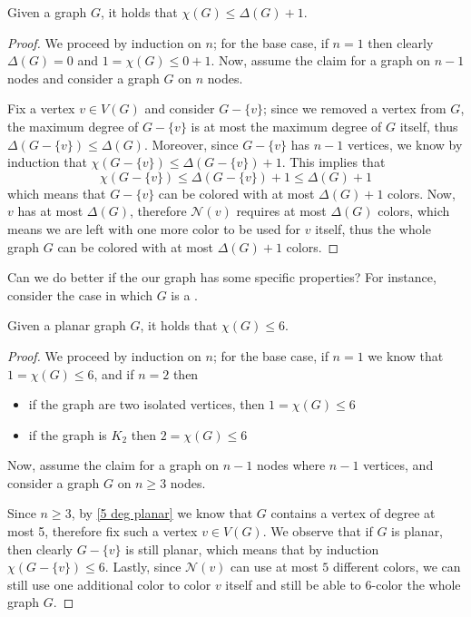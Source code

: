 \documentclass[a4paper, 12pt]{report}
\begin{document}
    \begin{framedprop}{}
        Given a graph $G$, it holds that $\chi(G) \le \Delta(G) + 1$.
    \end{framedprop}

    \begin{proof}
        We proceed by induction on $n$; for the base case, if $n = 1$ then clearly $\Delta(G) = 0$ and $1 = \chi(G) \le 0 + 1$. Now, assume the claim for a graph on $n - 1$ nodes and consider a graph $G$ on $n$ nodes.

        Fix a vertex $v \in V(G)$ and consider $G - \{v\}$; since we removed a vertex from $G$, the maximum degree of $G - \{v\}$ is at most the maximum degree of $G$ itself, thus $\Delta(G - \{v\}) \le \Delta(G)$. Moreover, since $G - \{v\}$ has $n - 1$ vertices, we know by induction that $\chi(G - \{v\}) \le \Delta(G - \{v\}) + 1$. This implies that $$\chi(G - \{v\}) \le \Delta(G - \{v\}) + 1 \le \Delta(G) + 1$$ which means that $G - \{v\}$ can be colored with at most $\Delta(G) + 1$ colors. Now, $v$ has at most $\Delta(G)$, therefore $\mathcal N(v)$ requires at most $\Delta(G)$ colors, which means we are left with one more color to be used for $v$ itself, thus the whole graph $G$ can be colored with at most $\Delta(G) + 1$ colors.
    \end{proof}

    Can we do better if the our graph has some specific properties? For instance, consider the case in which $G$ is a .

    \begin{framedprop}{}
        Given a planar graph $G$, it holds that $\chi(G) \le 6$.
    \end{framedprop}

    \begin{proof}

        We proceed by induction on $n$; for the base case, if $n = 1$ we know that $1 = \chi(G) \le 6$, and if $n = 2$ then

        \begin{itemize}
            \item if the graph are two isolated vertices, then $1 = \chi(G) \le 6$
            \item if the graph is $K_2$ then $2 = \chi(G) \le 6$
        \end{itemize}

        Now, assume the claim for a graph on $n - 1$ nodes where $n - 1$ vertices, and consider a graph $G$ on $n \ge 3$ nodes.

        Since $n \ge 3$, by \cref{5 deg planar} we know that $G$ contains a vertex of degree at most 5, therefore fix such a vertex $v \in V(G)$. We observe that if $G$ is planar, then clearly $G - \{v\}$ is still planar, which means that by induction $\chi(G - \{v\}) \le 6$. Lastly, since $\mathcal N(v)$ can use at most $5$ different colors, we can still use one additional color to color $v$ itself and still be able to 6-color the whole graph $G$.
    \end{proof}
\end{document}
